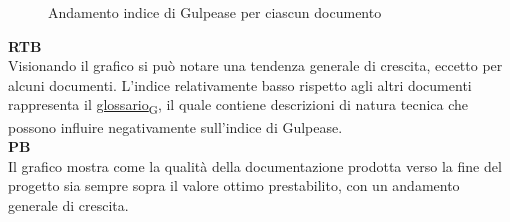 \begin{figure*}[!h]
    \caption{Andamento indice di Gulpease per ciascun documento}
\end{figure*}

\begin{flushleft}
\textbf{RTB} \\
Visionando il grafico si può notare una tendenza generale di crescita, eccetto per alcuni documenti. L'indice relativamente basso rispetto agli altri documenti rappresenta il \href{https://7last.github.io/docs/pb/documentazione-interna/glossario\#glossario}{glossario\textsubscript{G}}, il quale contiene descrizioni di natura tecnica che possono influire negativamente sull'indice di Gulpease. \\

\textbf{PB} \\
Il grafico mostra come la qualità della documentazione prodotta verso la fine del progetto sia sempre sopra il valore ottimo prestabilito, con un andamento generale di crescita. 
\end{flushleft}
\newpage
